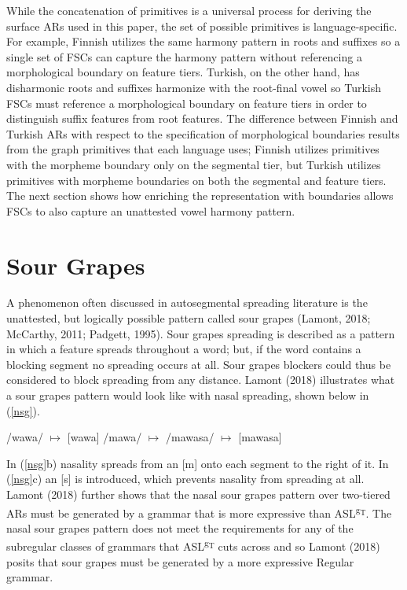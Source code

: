 \documentclass[,doc,floatsintext]{apa6}
\theoremstyle{definition}
\theoremstyle{definition}
\theoremstyle{definition}
\theoremstyle{remark}
\begin{document}
While the concatenation of primitives is a universal process for
deriving the surface ARs used in this paper, the set of possible
primitives is language-specific. For example, Finnish utilizes the same
harmony pattern in roots and suffixes so a single set of FSCs can
capture the harmony pattern without referencing a morphological boundary
on feature tiers. Turkish, on the other hand, has disharmonic roots and
suffixes harmonize with the root-final vowel so Turkish FSCs must
reference a morphological boundary on feature tiers in order to
distinguish suffix features from root features. The difference between
Finnish and Turkish ARs with respect to the specification of
morphological boundaries results from the graph primitives that each
language uses; Finnish utilizes primitives with the morpheme boundary
only on the segmental tier, but Turkish utilizes primitives with
morpheme boundaries on both the segmental and feature tiers. The next
section shows how enriching the representation with boundaries allows
FSCs to also capture an unattested vowel harmony pattern.

\section{Sour Grapes}\label{sour-grapes}

A phenomenon often discussed in autosegmental spreading literature is
the unattested, but logically possible pattern called sour grapes
(Lamont, 2018; McCarthy, 2011; Padgett, 1995). Sour grapes spreading is
described as a pattern in which a feature spreads throughout a word;
but, if the word contains a blocking segment no spreading occurs at all.
Sour grapes blockers could thus be considered to block spreading from
any distance. Lamont (2018) illustrates what a sour grapes pattern would
look like with nasal spreading, shown below in (\ref{nsg}).

\begin{exe}
\label{nsg}
\begin{xlist}
  \ex /wawa/ $\mapsto$ [wawa]
  \ex /mawa/ $\mapsto$ \textipa{[m\~a\~w\~a]}
  \ex /mawasa/ $\mapsto$ [mawasa]
\end{xlist}
\end{exe}

\noindent In (\ref{nsg}b) nasality spreads from an {[}m{]} onto each
segment to the right of it. In (\ref{nsg}c) an {[}s{]} is introduced,
which prevents nasality from spreading at all. Lamont (2018) further
shows that the nasal sour grapes pattern over two-tiered ARs must be
generated by a grammar that is more expressive than
ASL\textsuperscript{g\textsubscript{T}}. The nasal sour grapes pattern
does not meet the requirements for any of the subregular classes of
grammars that ASL\textsuperscript{g\textsubscript{T}} cuts across and so
Lamont (2018) posits that sour grapes must be generated by a more
expressive Regular grammar.
\end{document}
